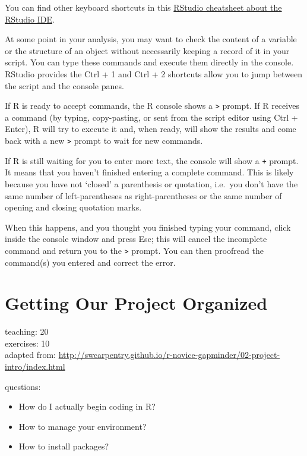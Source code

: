 \documentclass[]{book}
\providecommand{\tightlist}{%
  \setlength{\itemsep}{0pt}\setlength{\parskip}{0pt}}
\begin{document}
You can find other keyboard shortcuts in this
\href{https://github.com/rstudio/cheatsheets/raw/master/rstudio-ide.pdf}{RStudio
cheatsheet about the RStudio IDE}.

At some point in your analysis, you may want to check the content of a
variable or the structure of an object without necessarily keeping a
record of it in your script. You can type these commands and execute
them directly in the console. RStudio provides the Ctrl + 1 and Ctrl + 2
shortcuts allow you to jump between the script and the console panes.

If R is ready to accept commands, the R console shows a
\texttt{\textgreater{}} prompt. If R receives a command (by typing,
copy-pasting, or sent from the script editor using Ctrl + Enter), R will
try to execute it and, when ready, will show the results and come back
with a new \texttt{\textgreater{}} prompt to wait for new commands.

If R is still waiting for you to enter more text, the console will show
a \texttt{+} prompt. It means that you haven't finished entering a
complete command. This is likely because you have not `closed' a
parenthesis or quotation, i.e.~you don't have the same number of
left-parentheses as right-parentheses or the same number of opening and
closing quotation marks.

When this happens, and you thought you finished typing your command,
click inside the console window and press Esc; this will cancel the
incomplete command and return you to the \texttt{\textgreater{}} prompt.
You can then proofread the command(s) you entered and correct the error.

\chapter{Getting Our Project Organized}\label{projectmanagement}

teaching: 20\\
exercises: 10\\
adapted from:
\url{http://swcarpentry.github.io/r-novice-gapminder/02-project-intro/index.html}

questions:

\begin{itemize}
\tightlist
\item
  How do I actually begin coding in R?
\item
  How to manage your environment?\\
\item
  How to install packages?
\end{itemize}
\end{document}

